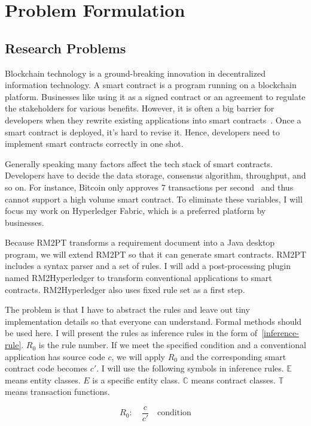 \chapter{Problem Formulation}

\section{Research Problems}

Blockchain technology is a ground-breaking innovation in decentralized information technology.
A smart contract is a program running on a blockchain platform.
Businesses like using it as a signed contract or an agreement to regulate the stakeholders for various benefits.
However, it is often a big barrier for developers when they rewrite existing applications into smart contracts~\cite{dao2019challenges}.
Once a smart contract is deployed, it's hard to revise it.
Hence, developers need to implement smart contracts correctly in one shot.

Generally speaking many factors affect the tech stack of smart contracts.
Developers have to decide the data storage, consensus algorithm, throughput, and so on.
For instance, Bitcoin only approves 7 transactions per second~\cite{croman2016scaling} and thus cannot support a high volume smart contract.
To eliminate these variables, I will focus my work on Hyperledger Fabric, which is a preferred platform by businesses.

Because RM2PT transforms a requirement document into a Java desktop program, we will extend RM2PT so that it can generate smart contracts.
RM2PT includes a syntax parser and a set of rules.
I will add a post-processing plugin named RM2Hyperledger to transform conventional applications to smart contracts.
RM2\-Hyperledger also uses fixed rule set as a first step.

The problem is that I have to abstract the rules and leave out tiny implementation details so that everyone can understand.
Formal methods should be used here.
I will present the rules as inference rules in the form of~\autoref{inference-rule}. $R_0$ is the rule number.
If we meet the specified condition and a conventional application has source code $c$, we will apply $R_0$ and the corresponding smart contract code becomes $c'$.
I will use the following symbols in inference rules. $\mathbb{E}$ means entity classes. $E$ is a specific entity class.
$\mathbb{C}$ means contract classes.
$\mathbb{T}$ means transaction functions.

\begin{equation}\label{inference-rule}
R_0:\quad \frac{c}{c'} \quad \text{condition}
\end{equation}

